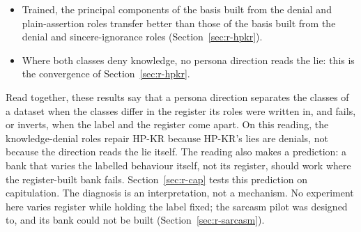 \begin{itemize}
On the text-matched slice, where every response denies, both score below 0.59 at layers 20, 40 and 44 (post hoc) (Section~\ref{sec:r-hpkr}). %
\item Trained, the principal components of the basis built from the denial and plain-assertion roles transfer better than those of the basis built from the denial and sincere-ignorance roles (Section~\ref{sec:r-hpkr}). %
\item Where both classes deny knowledge, no persona direction reads the lie: this is the convergence of Section~\ref{sec:r-hpkr}. %
\end{itemize}

Read together, these results say that a persona direction separates the classes of a dataset when the classes differ in the register its roles were written in, and fails, or inverts, when the label and the register come apart. %
On this reading, the knowledge-denial roles repair HP-KR because HP-KR's lies are denials, not because the direction reads the lie itself. %
The reading also makes a prediction: a bank that varies the labelled behaviour itself, not its register, should work where the register-built bank fails. %
Section~\ref{sec:r-cap} tests this prediction on capitulation.
The diagnosis is an interpretation, not a mechanism. %
No experiment here varies register while holding the label fixed; the sarcasm pilot was designed to, and its bank could not be built (Section~\ref{sec:r-sarcasm}). %

